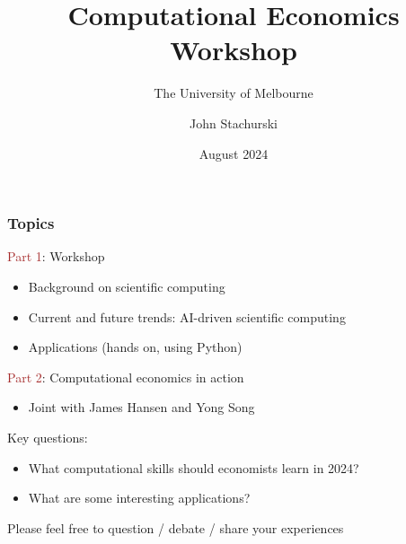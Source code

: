 \documentclass[
    xcolor={svgnames,dvipsnames},
    hyperref={colorlinks, citecolor=DeepPink4, linkcolor=DarkRed, urlcolor=DarkBlue}
    ]{beamer}  %
\title{Computational Economics Workshop}
\subtitle{The University of Melbourne}
\author{John Stachurski}
\date{August 2024}
\newcommand{\brown}[1]{\textcolor{Brown}{\sf #1}}
\newcommand{\1}{\mathbbm 1}
\begin{document}
\begin{frame}
  \titlepage
\end{frame}



\begin{frame}
    \frametitle{Topics}

    \brown{Part 1}: Workshop

    \begin{itemize}
        \item Background on scientific computing
        \vspace{0.5em}
        \item Current and future trends: AI-driven scientific computing
        \vspace{0.5em}
        \item Applications  (hands on, using Python)
        \vspace{0.5em}
    \end{itemize}

    \vspace{0.5em}
    \vspace{0.5em}
    \brown{Part 2}: Computational economics in action

    \begin{itemize}
        \item  Joint with James Hansen and Yong Song
    \end{itemize}


\end{frame}

\begin{frame}
    
    Key questions:

    \vspace{0.5em}

    \begin{itemize}
        \item What computational skills should economists learn in 2024?
        \vspace{0.5em}
        \item What are some interesting applications?
        \vspace{0.5em}
    \end{itemize}


    \vspace{0.5em}
    \vspace{0.5em}
    
    Please feel free to question / debate / share your experiences

\end{frame}
\end{document}

